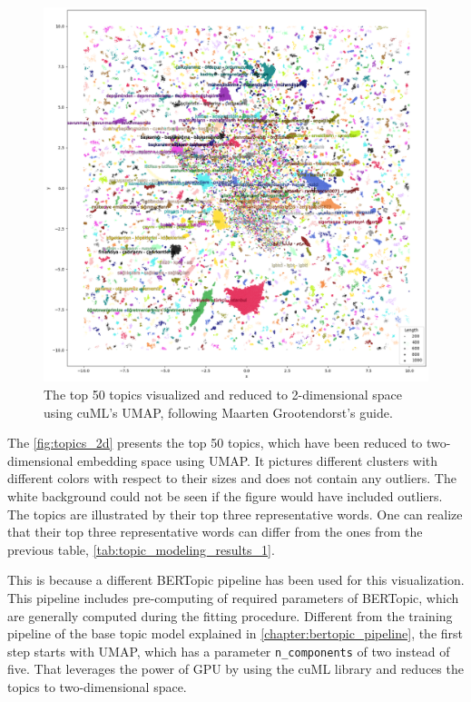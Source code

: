 \begin{figure}[h!]
    \centering
    \includegraphics[width=\linewidth]{figures/visualization_2d.png}
    \caption[The top 50 topics visualized and reduced to  two dimensional embedding space using cuML's UMAP]
    {The top 50 topics visualized and reduced to 2-dimensional space using cuML's UMAP, following 
    Maarten Grootendorst's guide.\footnotemark}\label{fig:topics_2d}
\end{figure}

The \autoref{fig:topics_2d} presents the top 50 topics, which have been reduced to 
two-dimensional embedding space using UMAP.
It pictures different clusters with different colors with respect to their sizes and 
does not contain any outliers. The white background could not be seen if the figure would 
have included outliers. 
The topics are illustrated by their top three representative words. One can realize that 
their top three representative words can differ from the ones from the previous table, 
\autoref{tab:topic_modeling_results_1}. 

This is because a different BERTopic pipeline has been used for this visualization. 
This pipeline includes pre-computing of required parameters of BERTopic, which are generally 
computed during the fitting procedure. Different from the training pipeline of the base topic 
model explained in \autoref{chapter:bertopic_pipeline}, the first step starts with UMAP, 
which has a parameter \texttt{n\_components} of two instead of five. 
That leverages the power of GPU by using the cuML library and reduces the topics to two-dimensional 
space. 

